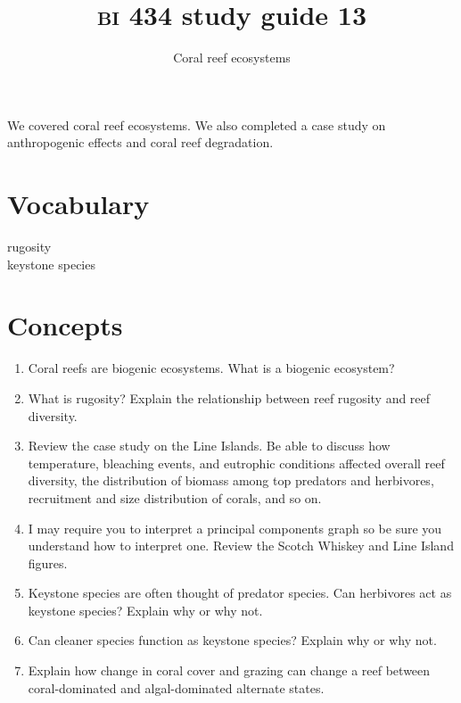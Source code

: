 \documentclass[letterpaper]{tufte-handout}
\title{{\scshape bi} 434 study guide 13}
\author{Coral reef ecosystems}
\date{} %
\begin{document}
\maketitle	%


We covered coral reef ecosystems. We also completed a case study on anthropogenic effects and coral reef degradation.

\section*{Vocabulary}
\begin{multicols}{2}
rugosity\\
keystone species
\end{multicols}
\section*{Concepts}

\begin{enumerate}

\item
  Coral reefs are biogenic ecosystems. What is a biogenic ecosystem? 
  
\item What is rugosity? Explain the relationship between reef rugosity and reef diversity.

\item Review the case study on the Line Islands. Be able to discuss how temperature, bleaching events, and eutrophic conditions affected overall reef diversity, the distribution of biomass among top predators and herbivores, recruitment and size distribution of corals, and so on.

\item I may require you to interpret a principal components graph so be sure you understand how to interpret one. Review the Scotch Whiskey and Line Island figures.

\item Keystone species are often thought of predator species. Can herbivores act as keystone species? Explain why or why not. 

\item Can cleaner species function as keystone species? Explain why or why not.

\item Explain how change in coral cover and grazing can change a reef between coral-dominated and algal-dominated alternate states.


\end{enumerate}
\end{document}
